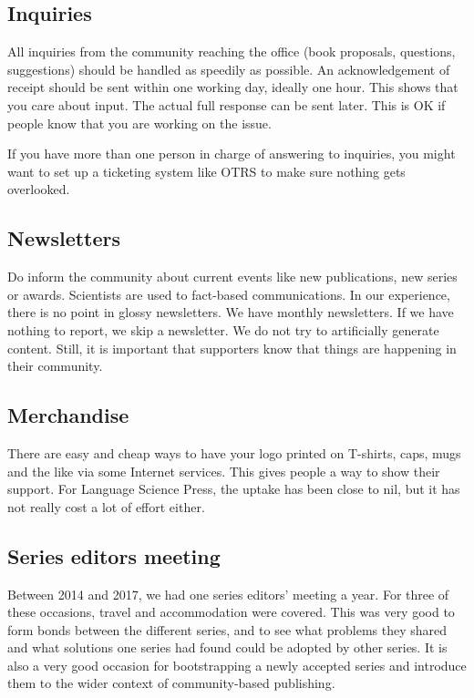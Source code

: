 \documentclass[nonflat,modfonts,output=book] {langsci/langscibook}
\begin{document}
\subsection{Inquiries}
All inquiries from the community reaching the office (book proposals, questions, suggestions) should be handled as speedily as possible. An acknowledgement of receipt should be sent within one working day, ideally one hour. This shows that you care about input. The actual full response can be sent later. This is OK if people know that you are working on the issue.


If you have more than one person in charge of answering to inquiries, you might want to set up a ticketing system like OTRS to make sure nothing gets overlooked. 

\subsection{Newsletters}
Do inform the community about current events like new publications, new series or awards. Scientists are used to fact-based communications. In our experience, there is no point in glossy newsletters. We have monthly newsletters. If we have nothing to report, we skip a newsletter. We do not try to artificially generate content. Still, it is important that supporters know that things are happening in their community.


\subsection{Merchandise}
There are easy and cheap ways to have your logo printed on T-shirts, caps, mugs and the like via some Internet services. This gives people a way to show their support. For Language Science Press, the uptake has been close to nil, but it has not really cost a lot of effort either. 

\subsection{Series editors meeting}  
Between 2014 and 2017, we had one series editors' meeting a year. For three of these occasions, travel and accommodation were covered. This was very good to form bonds between the different series, and to see what problems they shared and what solutions one series had found could be adopted by other series. It is also a very good occasion for bootstrapping a newly accepted series and introduce them to the wider context of community-based publishing. 
\end{document}
